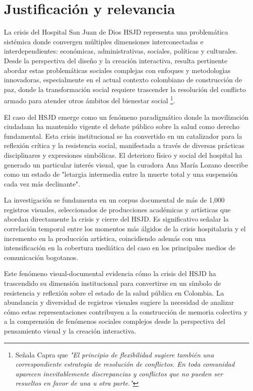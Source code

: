 \section*{Justificación y relevancia}
La crisis del Hospital San Juan de Dios HSJD representa una problemática sistémica donde convergen múltiples dimensiones interconectadas e interdependientes: económicas, administrativas, sociales, políticas y culturales. Desde la perspectiva del diseño y la creación interactiva, resulta pertinente abordar estas problemáticas sociales complejas con enfoques y metodologìas innovadoras, especialmente en el actual contexto colombiano de construcción de paz, donde la transformación social requiere trascender la resolución del conflicto armado para atender otros ámbitos del bienestar social \parencite[p. 313]{Capra1998}\footnote{Señala Capra que \textit{"El principio de flexibilidad sugiere también una correspondiente estrategia de resolución de conflictos. En toda comunidad aparecen inevitablemente discrepancias y conflictos que no pueden ser resueltos en favor de una u otra parte."}}.

El caso del HSJD emerge como un fenómeno paradigmático donde la movilización ciudadana ha mantenido vigente el debate público sobre la salud como derecho fundamental. Esta crisis institucional se ha convertido en un catalizador para la reflexión crítica y la resistencia social, manifestada a través de diversas prácticas disciplinares y expresiones simbólicas. El deterioro físico y social del hospital ha generado un particular interés visual, que la curadora Ana María Lozano describe como un estado de "letargia intermedia entre la muerte total y una suspensión cada vez más declinante".

La investigación se fundamenta en un corpus documental de más de 1,000 registros visuales, seleccionados de producciones académicas y artísticas que abordan directamente la crisis y cierre del HSJD. Es significativo señalar la correlación temporal entre los momentos más álgidos de la crisis hospitalaria y el incremento en la producción artística, coincidiendo además con una intensificación en la cobertura mediática del caso en los principales medios de comunicación bogotanos.

Este fenómeno visual-documental evidencia cómo la crisis del HSJD ha trascendido su dimensión institucional para convertirse en un símbolo de resistencia y reflexión sobre el estado de la salud pública en Colombia. La abundancia y diversidad de registros visuales sugiere la necesidad de analizar cómo estas representaciones contribuyen a la construcción de memoria colectiva y a la comprensión de fenómenos sociales complejos desde la perspectiva del pensamiento visual y la creación interactiva.

